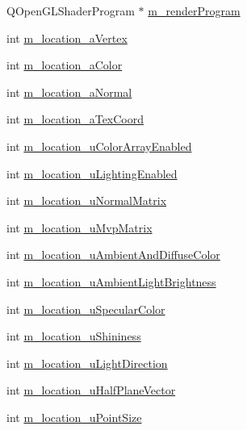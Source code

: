\begin{DoxyCompactItemize}
Q\+Open\+G\+L\+Shader\+Program $\ast$ \mbox{\hyperlink{class_g_l_e_s_renderer_a49b1f32fad69d86fb7522d1a3f1e8d4f}{m\+\_\+render\+Program}}
\item 
int \mbox{\hyperlink{class_g_l_e_s_renderer_ab03a79822dd105e1a0e5eecb65ee492b}{m\+\_\+location\+\_\+a\+Vertex}}
\item 
int \mbox{\hyperlink{class_g_l_e_s_renderer_a5bf9f36f33237a7fe2706f60c341dec9}{m\+\_\+location\+\_\+a\+Color}}
\item 
int \mbox{\hyperlink{class_g_l_e_s_renderer_adca575c93185a1beb32bf54235a7766f}{m\+\_\+location\+\_\+a\+Normal}}
\item 
int \mbox{\hyperlink{class_g_l_e_s_renderer_af5b18a94719f0b93d32be7cd9262fcfb}{m\+\_\+location\+\_\+a\+Tex\+Coord}}
\item 
int \mbox{\hyperlink{class_g_l_e_s_renderer_aafa0944ec42f35eb2ebf08fe0e850ad7}{m\+\_\+location\+\_\+u\+Color\+Array\+Enabled}}
\item 
int \mbox{\hyperlink{class_g_l_e_s_renderer_a8d61c896b68041ae2439d21ed6981f28}{m\+\_\+location\+\_\+u\+Lighting\+Enabled}}
\item 
int \mbox{\hyperlink{class_g_l_e_s_renderer_aec01e0adb9416c451d958f925a64d329}{m\+\_\+location\+\_\+u\+Normal\+Matrix}}
\item 
int \mbox{\hyperlink{class_g_l_e_s_renderer_a51a95f6a35efdde4a6e103ecae334322}{m\+\_\+location\+\_\+u\+Mvp\+Matrix}}
\item 
int \mbox{\hyperlink{class_g_l_e_s_renderer_a4125a33e9cea4fbc0e7e23edb4b4de43}{m\+\_\+location\+\_\+u\+Ambient\+And\+Diffuse\+Color}}
\item 
int \mbox{\hyperlink{class_g_l_e_s_renderer_a0dc79f50f3eea91e32316a6ecd8a9754}{m\+\_\+location\+\_\+u\+Ambient\+Light\+Brightness}}
\item 
int \mbox{\hyperlink{class_g_l_e_s_renderer_a0945edb3cd12c3228e405519d9cebe08}{m\+\_\+location\+\_\+u\+Specular\+Color}}
\item 
int \mbox{\hyperlink{class_g_l_e_s_renderer_af1152640d14a616c9930161402da5eb3}{m\+\_\+location\+\_\+u\+Shininess}}
\item 
int \mbox{\hyperlink{class_g_l_e_s_renderer_aba8a7f233b51b258542adce7114a93da}{m\+\_\+location\+\_\+u\+Light\+Direction}}
\item 
int \mbox{\hyperlink{class_g_l_e_s_renderer_a8a4088b65277a3efa4810454c00e6a16}{m\+\_\+location\+\_\+u\+Half\+Plane\+Vector}}
\item 
int \mbox{\hyperlink{class_g_l_e_s_renderer_a3cab0140a32534203dc8070058647d02}{m\+\_\+location\+\_\+u\+Point\+Size}}

\end{DoxyCompactItemize}
